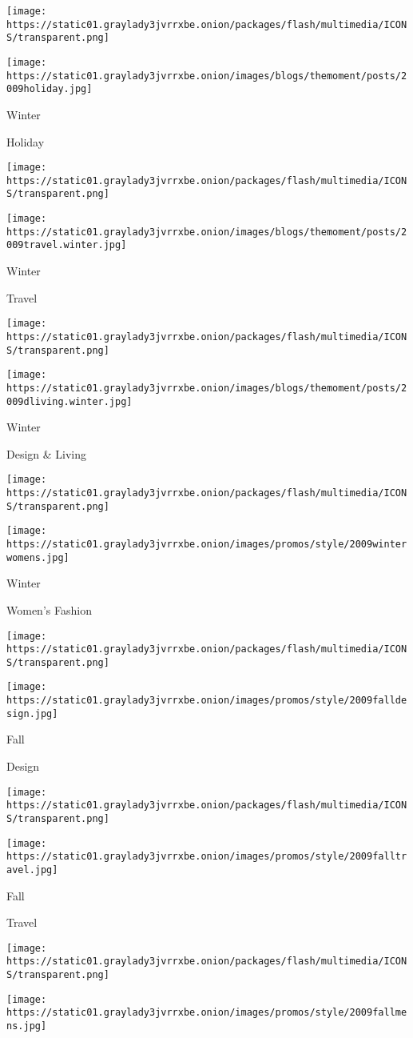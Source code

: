 \texttt{[image: https://static01.graylady3jvrrxbe.onion/packages/flash/multimedia/ICONS/transparent.png]}

\texttt{[image: https://static01.graylady3jvrrxbe.onion/images/blogs/themoment/posts/2009holiday.jpg]}

Winter

Holiday

\texttt{[image: https://static01.graylady3jvrrxbe.onion/packages/flash/multimedia/ICONS/transparent.png]}

\texttt{[image: https://static01.graylady3jvrrxbe.onion/images/blogs/themoment/posts/2009travel.winter.jpg]}

Winter

Travel

\texttt{[image: https://static01.graylady3jvrrxbe.onion/packages/flash/multimedia/ICONS/transparent.png]}

\texttt{[image: https://static01.graylady3jvrrxbe.onion/images/blogs/themoment/posts/2009dliving.winter.jpg]}

Winter

Design \& Living

\texttt{[image: https://static01.graylady3jvrrxbe.onion/packages/flash/multimedia/ICONS/transparent.png]}

\texttt{[image: https://static01.graylady3jvrrxbe.onion/images/promos/style/2009winterwomens.jpg]}

Winter

Women's Fashion

\texttt{[image: https://static01.graylady3jvrrxbe.onion/packages/flash/multimedia/ICONS/transparent.png]}

\texttt{[image: https://static01.graylady3jvrrxbe.onion/images/promos/style/2009falldesign.jpg]}

Fall

Design

\texttt{[image: https://static01.graylady3jvrrxbe.onion/packages/flash/multimedia/ICONS/transparent.png]}

\texttt{[image: https://static01.graylady3jvrrxbe.onion/images/promos/style/2009falltravel.jpg]}

Fall

Travel

\texttt{[image: https://static01.graylady3jvrrxbe.onion/packages/flash/multimedia/ICONS/transparent.png]}

\texttt{[image: https://static01.graylady3jvrrxbe.onion/images/promos/style/2009fallmens.jpg]}

